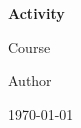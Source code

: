 \begin{titlepage}
    \centering

    \begin{minipage}{0.75\textwidth}
        
    \end{minipage}

    \vfill

    {\LARGE \bfseries Activity}

    \vspace{1.5em}

    {\large Course}

    \vfill

    {\large Author}

    \vspace{1.5em}

    {\large \today}

    \vfill
\end{titlepage}